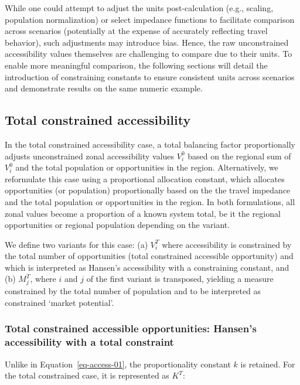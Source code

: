 \documentclass[
]{article}
\begin{document}
While one could attempt to adjust the units post-calculation (e.g.,
scaling, population normalization) or select impedance functions to
facilitate comparison across scenarios (potentially at the expense of
accurately reflecting travel behavior), such adjustments may introduce
bias. Hence, the raw unconstrained accessibility values themselves are
challenging to compare due to their units. To enable more meaningful
comparison, the following sections will detail the introduction of
constraining constants to ensure consistent units across scenarios and
demonstrate results on the same numeric example.

\subsection{Total constrained
accessibility}\label{total-constrained-accessibility}

In the total constrained accessibility case, a total balancing factor
proportionally adjusts unconstrained zonal accessibility values
\(V^0_i\) based on the regional sum of \(V^0_i\) and the total
population or opportunities in the region. Alternatively, we reformulate
this case using a proportional allocation constant, which allocates
opportunities (or population) proportionally based on the the travel
impedance and the total population or opportunities in the region. In
both formulations, all zonal values become a proportion of a known
system total, be it the regional opportunities or regional population
depending on the variant.

We define two variants for this case: (a) \(V_i^T\) where accessibility
is constrained by the total number of opportunities (total constrained
accessible opportunity) and which is interpreted as Hansen's
accessibility with a constraining constant, and (b) \(M_j^T\), where
\(i\) and \(j\) of the first variant is transposed, yielding a measure
constrained by the total number of population and to be interpreted as
constrained `market potential'.

\subsubsection{Total constrained accessible opportunities: Hansen's
accessibility with a total
constraint}\label{total-constrained-accessible-opportunities-hansens-accessibility-with-a-total-constraint}

Unlike in Equation~\ref{eq-access-01}, the proportionality constant
\(k\) is retained. For the total constrained case, it is represented as
\(K^T\):
\end{document}
